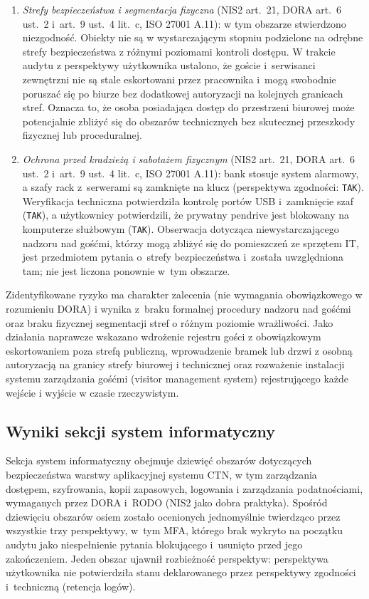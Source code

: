 \begin{enumerate}[label=(\roman*)]
  \item \textit{Strefy bezpieczeństwa i segmentacja fizyczna} (NIS2 art.~21, DORA art.~6 ust.~2 i~art.~9 ust.~4 lit.~c, ISO 27001 A.11): w tym obszarze stwierdzono niezgodność. Obiekty nie są w wystarczającym stopniu podzielone na odrębne strefy bezpieczeństwa z różnymi poziomami kontroli dostępu. W trakcie audytu z perspektywy użytkownika ustalono, że goście i~serwisanci zewnętrzni nie są stale eskortowani przez pracownika i~mogą swobodnie poruszać się po biurze bez dodatkowej autoryzacji na kolejnych granicach stref. Oznacza to, że osoba posiadająca dostęp do przestrzeni biurowej może potencjalnie zbliżyć się do obszarów technicznych bez skutecznej przeszkody fizycznej lub proceduralnej.

  \item \textit{Ochrona przed kradzieżą i sabotażem fizycznym} (NIS2 art.~21, DORA art.~6 ust.~2 i~art.~9 ust.~4 lit.~c, ISO 27001 A.11): bank stosuje system alarmowy, a szafy rack z~serwerami są zamknięte na klucz (perspektywa zgodności: \texttt{TAK}). Weryfikacja techniczna potwierdziła kontrolę portów USB i~zamknięcie szaf (\texttt{TAK}), a użytkownicy potwierdzili, że prywatny pendrive jest blokowany na komputerze służbowym (\texttt{TAK}). Obserwacja dotycząca niewystarczającego nadzoru nad gośćmi, którzy mogą zbliżyć się do pomieszczeń ze sprzętem IT, jest przedmiotem pytania o~strefy bezpieczeństwa i~została uwzględniona tam; nie jest liczona ponownie w~tym obszarze.
\end{enumerate}
Zidentyfikowane ryzyko ma charakter zalecenia (nie wymagania obowiązkowego w rozumieniu DORA) i wynika z~braku formalnej procedury nadzoru nad gośćmi oraz braku fizycznej segmentacji stref o różnym poziomie wrażliwości. Jako działania naprawcze wskazano wdrożenie rejestru gości z obowiązkowym eskortowaniem poza strefą publiczną, wprowadzenie bramek lub drzwi z osobną autoryzacją na granicy strefy biurowej i technicznej oraz rozważenie instalacji systemu zarządzania gośćmi (visitor management system) rejestrującego każde wejście i wyjście w czasie rzeczywistym.

\subsection{Wyniki sekcji system informatyczny}

Sekcja system informatyczny obejmuje dziewięć obszarów dotyczących bezpieczeństwa warstwy aplikacyjnej systemu CTN, w tym zarządzania dostępem, szyfrowania, kopii zapasowych, logowania i zarządzania podatnościami, wymaganych przez DORA i~RODO (NIS2 jako dobra praktyka). Spośród dziewięciu obszarów osiem zostało ocenionych jednomyślnie twierdząco przez wszystkie trzy perspektywy, w~tym MFA, którego brak wykryto na początku audytu jako niespełnienie pytania blokującego i~usunięto przed jego zakończeniem. Jeden obszar ujawnił rozbieżność perspektyw: perspektywa użytkownika nie potwierdziła stanu deklarowanego przez perspektywy zgodności i~techniczną (retencja logów).

